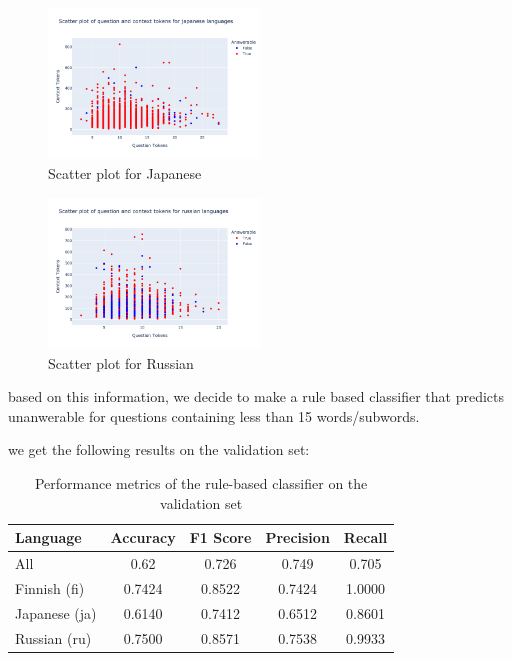 \documentclass[11pt]{article}
\begin{document}
\begin{enumerate}
    \begin{figure}[ht]
        \centering
        \includegraphics[width=0.5\textwidth]{week1_c_scatter_ja.png}
        \caption{Scatter plot for Japanese}
        \label{fig:scatter_ja}
    \end{figure}
    
    \begin{figure}[ht]
        \centering
        \includegraphics[width=0.5\textwidth]{week1_c_scatter_ru.png}
        \caption{Scatter plot for Russian}
        \label{fig:scatter_ru}
    \end{figure}


    based on this information, we decide to make a rule based classifier that predicts unanwerable for questions containing less than 15 words/subwords.

    we get the following results on the validation set:

    \begin{table}[ht]
        \centering
        \begin{tabular}{|l|c|c|c|c|}
            \hline
            Language & Accuracy & F1 Score & Precision & Recall \\
            \hline
            All & 0.62 & 0.726 & 0.749 & 0.705 \\
            Finnish (fi) & 0.7424 & 0.8522 & 0.7424 & 1.0000 \\
            Japanese (ja) & 0.6140 & 0.7412 & 0.6512 & 0.8601 \\
            Russian (ru) & 0.7500 & 0.8571 & 0.7538 & 0.9933 \\
            \hline
        \end{tabular}
        \caption{Performance metrics of the rule-based classifier on the validation set}
        \label{tab:classifier_performance}
    \end{table}


\end{enumerate}
\end{document}
